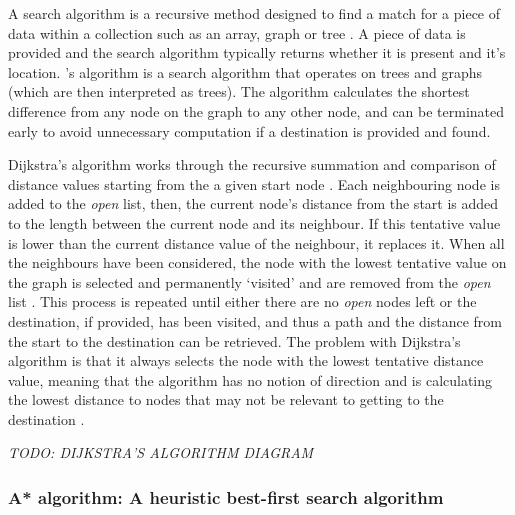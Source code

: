 \documentclass[11pt, a4paper]{article}
\begin{document}
A search algorithm is a recursive method designed to find a match for a piece of data within a collection such as an array, graph or tree \parencite{friedman1976algorithm}. A piece of data is provided and the search algorithm typically returns whether it is present and it's location. \citeauthor{dijkstra1959note}'s algorithm \parencite*{dijkstra1959note} is a search algorithm that operates on trees and graphs (which are then interpreted as trees). The algorithm calculates the shortest difference from any node on the graph to any other node, and can be terminated early to avoid unnecessary computation if a destination is provided and found.

Dijkstra's algorithm works through the recursive summation and comparison of distance values starting from the a given start node \parencite[269]{dijkstra1959note}. Each neighbouring node is added to the \emph{open} list, then, the current node's distance from the start is added to the length between the current node and its neighbour. If this tentative value is lower than the current distance value of the neighbour, it replaces it. When all the neighbours have been considered, the node with the lowest tentative value on the graph is selected and permanently `visited' and are removed from the \emph{open} list \parencite{dijkstra1959note}. This process is repeated until either there are no \emph{open} nodes left or the destination, if provided, has been visited, and thus a path and the distance from the start to the destination can be retrieved. The problem with Dijkstra's algorithm is that it always selects the node with the lowest tentative distance value, meaning that the algorithm has no notion of direction and is calculating the lowest distance to nodes that may not be relevant to getting to the destination \parencite[214]{millington2019ai}.

\emph{TODO: DIJKSTRA'S ALGORITHM DIAGRAM}

\subsubsection{A* algorithm: A heuristic best-first search algorithm}
\label{subsubsec:aStarAlgorithm}
\end{document}
